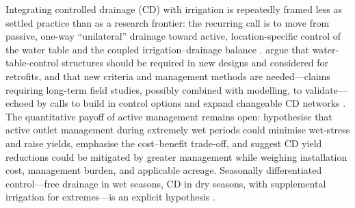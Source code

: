 Integrating controlled drainage (CD) with irrigation is repeatedly framed less as
settled practice than as a research frontier: the recurring call is to move from
passive, one-way ``unilateral'' drainage toward active, location-specific control
of the water table and the coupled irrigation--drainage balance
\parencite{Ayars2006b,Kesicka2023b,Ritzema2023}. \textcite{Ayars2006b} argue that
water-table-control structures should be required in new designs and considered
for retrofits, and that new criteria and management methods are needed---claims
requiring long-term field studies, possibly combined with modelling, to
validate---echoed by calls to build in control options and expand changeable CD
networks \parencite{Dukhovny2018,Mahmoud2021,Strock2011}. The quantitative payoff
of active management remains open: \textcite{Watkins2024} hypothesise that active
outlet management during extremely wet periods could minimise wet-stress and raise
yields, \textcite{Saadat2017} emphasise the cost--benefit trade-off, and
\textcite{Helmers2012} suggest CD yield reductions could be mitigated by greater
management while weighing installation cost, management burden, and applicable
acreage. Seasonally differentiated control---free drainage in wet seasons, CD in
dry seasons, with supplemental irrigation for extremes---is an explicit hypothesis
\parencite{Asgari2021}.

